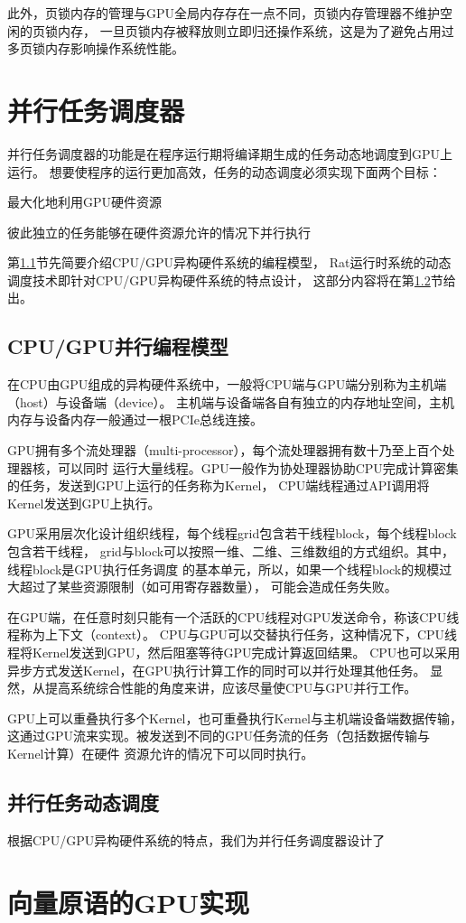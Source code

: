 此外，页锁内存的管理与GPU全局内存存在一点不同，页锁内存管理器不维护空闲的页锁内存，
一旦页锁内存被释放则立即归还操作系统，这是为了避免占用过多页锁内存影响操作系统性能。

\section{并行任务调度器}\label{sec:task-scheduler}
并行任务调度器的功能是在程序运行期将编译期生成的任务动态地调度到GPU上运行。
想要使程序的运行更加高效，任务的动态调度必须实现下面两个目标：
\begin{compactitem}
  \item 最大化地利用GPU硬件资源
  \item 彼此独立的任务能够在硬件资源允许的情况下并行执行
\end{compactitem}

第\ref{cpu-gpu-model}节先简要介绍CPU/GPU异构硬件系统的编程模型，
Rat运行时系统的动态调度技术即针对CPU/GPU异构硬件系统的特点设计，
这部分内容将在第\ref{subsec:task-scheduling}节给出。

\subsection{CPU/GPU并行编程模型}\label{cpu-gpu-model}
在CPU由GPU组成的异构硬件系统中，一般将CPU端与GPU端分别称为主机端（host）与设备端（device）。
主机端与设备端各自有独立的内存地址空间，主机内存与设备内存一般通过一根PCIe总线连接。

GPU拥有多个流处理器（multi-processor），每个流处理器拥有数十乃至上百个处理器核，可以同时
运行大量线程。GPU一般作为协处理器协助CPU完成计算密集的任务，发送到GPU上运行的任务称为Kernel，
CPU端线程通过API调用将Kernel发送到GPU上执行。

GPU采用层次化设计组织线程，每个线程grid包含若干线程block，每个线程block包含若干线程，
grid与block可以按照一维、二维、三维数组的方式组织。其中，线程block是GPU执行任务调度
的基本单元，所以，如果一个线程block的规模过大超过了某些资源限制（如可用寄存器数量），
可能会造成任务失败。

在GPU端，在任意时刻只能有一个活跃的CPU线程对GPU发送命令，称该CPU线程称为上下文（context）。
CPU与GPU可以交替执行任务，这种情况下，CPU线程将Kernel发送到GPU，然后阻塞等待GPU完成计算返回结果。
CPU也可以采用异步方式发送Kernel，在GPU执行计算工作的同时可以并行处理其他任务。
显然，从提高系统综合性能的角度来讲，应该尽量使CPU与GPU并行工作。

GPU上可以重叠执行多个Kernel，也可重叠执行Kernel与主机端设备端数据传输，
这通过GPU流来实现。被发送到不同的GPU任务流的任务（包括数据传输与Kernel计算）在硬件
资源允许的情况下可以同时执行。

\subsection{并行任务动态调度}\label{subsec:task-scheduling}
根据CPU/GPU异构硬件系统的特点，我们为并行任务调度器设计了



\section{向量原语的GPU实现}\label{sec:vp-driver}

